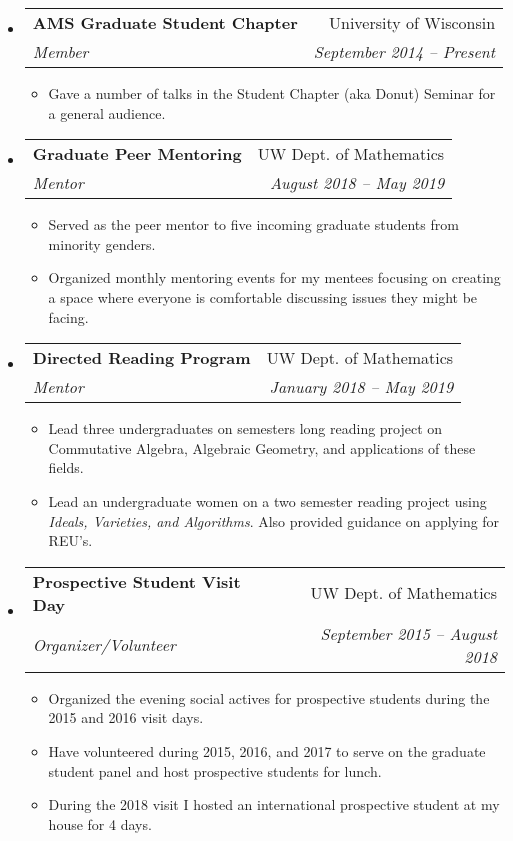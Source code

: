 \documentclass[letterpaper,11pt]{article}
\makeatletter
\newcommand{\ressubheading}[4]{
\begin{tabular*}{6.5in}[t]{l@{\cftdotfill{\cftsecdotsep}\extracolsep{\fill}}r}
		\textbf{#1} & #2 \\
		\textit{#3} & \textit{#4} \\
\end{tabular*}\vspace{-6pt}}
\makeatother
\begin{document}
\begin{itemize}
	
\item 
	\ressubheading{AMS Graduate Student Chapter}{University of Wisconsin}{Member}{September 2014 -- Present}
\begin{itemize}
	\item Gave a number of talks in the Student Chapter (aka Donut) Seminar for a general audience.
\end{itemize}

\item 
	\ressubheading{Graduate Peer Mentoring}{UW Dept. of Mathematics}{Mentor}{August 2018 -- May 2019}
	\begin{itemize}
		\item Served as the peer mentor to five incoming graduate students from minority genders.
		\item Organized monthly mentoring events for my mentees focusing on creating a space where everyone is comfortable discussing issues they might be facing.
	\end{itemize} 
	
\item 
	\ressubheading{Directed Reading Program}{UW Dept. of Mathematics}{Mentor}{January 2018 -- May 2019}
	\begin{itemize}
		\item Lead three undergraduates on semesters long reading project on Commutative Algebra, Algebraic Geometry, and applications of these fields. 
		\item Lead an undergraduate women on a two semester reading project using \textit{Ideals, Varieties, and Algorithms}. Also provided guidance on applying for REU's. 
	\end{itemize} 
	
\item 
	\ressubheading{Prospective Student Visit Day}{UW Dept. of Mathematics}{Organizer/Volunteer}{September 2015 -- August 2018}
	\begin{itemize}
		\item Organized the evening social actives for prospective students during the 2015 and 2016 visit days.
		\item Have volunteered during 2015, 2016, and 2017 to serve on the graduate student panel and host prospective students for lunch.
		
		\item During the 2018 visit I hosted an international prospective student at my house for 4 days.
		

\end{itemize}
\end{itemize}
\end{document}

